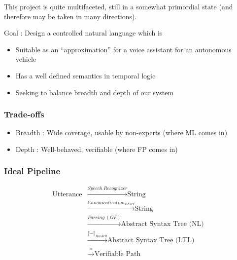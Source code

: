\documentclass{beamer}
\begin{document}
\begin{frame}

\begin{exampleblock}{}
This project is quite multifaceted, still in a somewhat primordial state (and therefore may be taken in many directions).
\end{exampleblock}

\begin{block}{}
Goal : Design a controlled natural language which is 
\end{block}

\begin{itemize}
\item Suitable as an ``approximation'' for a voice assistant for an autonomous vehicle
\item Has a well defined semantics in temporal logic
\item Seeking to balance breadth and depth of our system
\end{itemize}

\end{frame}

\begin{frame}

\frametitle{Trade-offs}

\begin{itemize}
\item Breadth : Wide coverage, usable by non-experts (where ML comes in)
\item Depth   : Well-behaved, verifiable (where FP comes in)
\end{itemize}

\end{frame}

\begin{frame}
\frametitle{Ideal Pipeline}

\begin{equation} %
\begin{split}
\text{Utterance} & \xrightarrow{\mathit{Speech\ Recognizer}} \text{String}\\
 & \xrightarrow{\mathit{Canonicalization_{BERT}}} \text{String}\\
 & \xrightarrow{\mathit{Parsing\ (GF)}} \text{Abstract Syntax Tree (NL)}\\
 & \xrightarrow{\llbracket - \rrbracket_{Haskell}} \text{Abstract Syntax Tree (LTL)}\\
 & \xrightarrow{\vDash} \text{Verifiable Path}
\end{split}
\end{equation} 
\end{frame}
\end{document}
